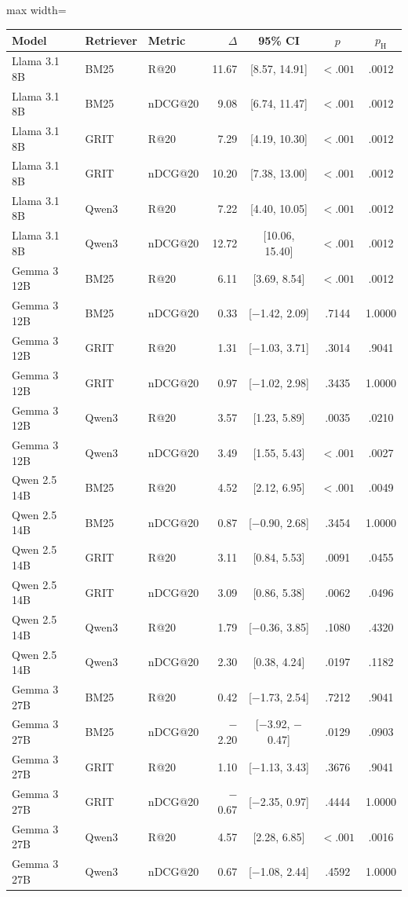 \documentclass[pdflatex,sn-basic,Numbered]{sn-jnl}%
\theoremstyle{thmstyleone}%
\theoremstyle{thmstyletwo}%
\theoremstyle{thmstylethree}%
\begin{document}
\begin{table}[t]


\centering
\scriptsize
\setlength{\tabcolsep}{4pt}
\renewcommand{\arraystretch}{0.96}
\begin{adjustbox}{max width=\linewidth}
\begin{tabular}{l l l r c c c}
\hline
Model & Retriever & Metric & $\Delta$ & 95\% CI & $p$ & $p_{\mathrm{H}}$ \\
\hline
Llama 3.1 8B & BM25 & R@20 & 11.67 & [8.57, 14.91] & $<.001$ & .0012 \\
Llama 3.1 8B & BM25 & nDCG@20 & 9.08 & [6.74, 11.47] & $<.001$ & .0012 \\
Llama 3.1 8B & GRIT & R@20 & 7.29 & [4.19, 10.30] & $<.001$ & .0012 \\
Llama 3.1 8B & GRIT & nDCG@20 & 10.20 & [7.38, 13.00] & $<.001$ & .0012 \\
Llama 3.1 8B & Qwen3 & R@20 & 7.22 & [4.40, 10.05] & $<.001$ & .0012 \\
Llama 3.1 8B & Qwen3 & nDCG@20 & 12.72 & [10.06, 15.40] & $<.001$ & .0012 \\
\hline
Gemma 3 12B & BM25 & R@20 & 6.11 & [3.69, 8.54] & $<.001$ & .0012 \\
Gemma 3 12B & BM25 & nDCG@20 & 0.33 & [$-$1.42, 2.09] & .7144 & 1.0000 \\
Gemma 3 12B & GRIT & R@20 & 1.31 & [$-$1.03, 3.71] & .3014 & .9041 \\
Gemma 3 12B & GRIT & nDCG@20 & 0.97 & [$-$1.02, 2.98] & .3435 & 1.0000 \\
Gemma 3 12B & Qwen3 & R@20 & 3.57 & [1.23, 5.89] & .0035 & .0210 \\
Gemma 3 12B & Qwen3 & nDCG@20 & 3.49 & [1.55, 5.43] & $<.001$ & .0027 \\
\hline
Qwen 2.5 14B & BM25 & R@20 & 4.52 & [2.12, 6.95] & $<.001$ & .0049 \\
Qwen 2.5 14B & BM25 & nDCG@20 & 0.87 & [$-$0.90, 2.68] & .3454 & 1.0000 \\
Qwen 2.5 14B & GRIT & R@20 & 3.11 & [0.84, 5.53] & .0091 & .0455 \\
Qwen 2.5 14B & GRIT & nDCG@20 & 3.09 & [0.86, 5.38] & .0062 & .0496 \\
Qwen 2.5 14B & Qwen3 & R@20 & 1.79 & [$-$0.36, 3.85] & .1080 & .4320 \\
Qwen 2.5 14B & Qwen3 & nDCG@20 & 2.30 & [0.38, 4.24] & .0197 & .1182 \\
\hline
Gemma 3 27B & BM25 & R@20 & 0.42 & [$-$1.73, 2.54] & .7212 & .9041 \\
Gemma 3 27B & BM25 & nDCG@20 & $-$2.20 & [$-$3.92, $-$0.47] & .0129 & .0903 \\
Gemma 3 27B & GRIT & R@20 & 1.10 & [$-$1.13, 3.43] & .3676 & .9041 \\
Gemma 3 27B & GRIT & nDCG@20 & $-$0.67 & [$-$2.35, 0.97] & .4444 & 1.0000 \\
Gemma 3 27B & Qwen3 & R@20 & 4.57 & [2.28, 6.85] & $<.001$ & .0016 \\
Gemma 3 27B & Qwen3 & nDCG@20 & 0.67 & [$-$1.08, 2.44] & .4592 & 1.0000 \\
\hline
\end{tabular}
\end{adjustbox}



\end{table}
\end{document}
